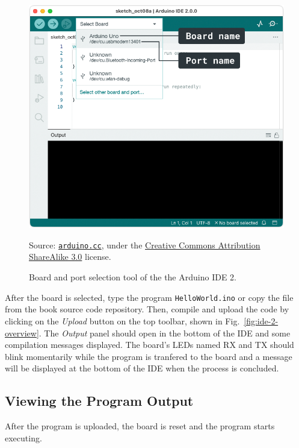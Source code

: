 \begin{figure}[b]
  \centering
  \includegraphics[width=\textwidth]{img/board-selector-labels}%
  \\ \scriptsize
  \raggedright
  Source: \href{https://support.arduino.cc/hc/en-us/articles/4406856349970-Select-board-and-port-in-Arduino-IDE}{\texttt{arduino.cc}}, under the \href{https://creativecommons.org/licenses/by-sa/3.0/legalcode}{Creative Commons Attribution ShareAlike 3.0} license.
  \caption{Board and port selection tool of the the Arduino IDE 2.
  }
  \label{fig:board-selector-labels}
\end{figure}

After the board is selected, type the program \texttt{HelloWorld.ino} or copy the file from the book source code repository.
Then, compile and upload the code by clicking on the \emph{Upload} button on the top toolbar, shown in Fig.~\ref{fig:ide-2-overview}.
The \emph{Output} panel should open in the bottom of the IDE and some compilation messages displayed.
The board's LEDs named RX and TX should blink momentarily while the program is tranfered to the board and a message will be displayed at the bottom of the IDE when the process is concluded.

\subsection{Viewing the Program Output}
After the program is uploaded, the board is reset and the program starts executing.

